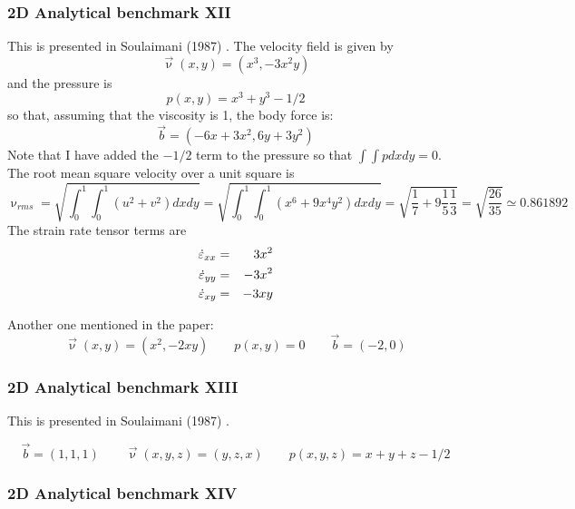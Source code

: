 \subsubsection{2D Analytical benchmark XII}\label{ss:sofo87_2D}

This is presented in Soulaimani \etal (1987) \cite{sofo87}. 
The velocity field is given by
\[
\vec\upnu(x,y) = (x^3,-3x^2y) 
\]
and the pressure is 
\[
p(x,y)=x^3+y^3-1/2
\]
so that, assuming that the viscosity is 1, the body force is:
\[
\vec{b} = (-6x+3x^2,6y+3y^2)
\] 
Note that I have added the $-1/2$ term to the pressure so that $\int\int p dxdy=0$.
The root mean square velocity over a unit square is 
\[
\upnu_{rms} 
= \sqrt{ \int_0^1\int_0^1 (u^2+v^2) dx dy }
= \sqrt{ \int_0^1\int_0^1 (x^6 + 9 x^4 y^2) dx dy }
= \sqrt{ \frac{1}{7} + 9 \frac{1}{5} \frac{1}{3}  } 
= \sqrt{ \frac{26}{35} }
\simeq 0.861892 
\]
The strain rate tensor terms are
\begin{eqnarray}
\dot{\varepsilon}_{xx} &=& 3x^2  \nonumber\\
\dot{\varepsilon}_{yy} &=& -3x^2 \nonumber\\ 
\dot{\varepsilon}_{xy} &=& -3xy  \nonumber
\end{eqnarray}

Another one mentioned in the paper:
\[
\vec\upnu(x,y) =(x^2,-2xy)
\qquad
p(x,y)=0
\qquad
\vec{b}=(-2,0) 
\]

\subsubsection{2D Analytical benchmark XIII}\label{ss:sofo87_3D}

This is presented in Soulaimani \etal (1987) \cite{sofo87}. 

\[
\vec{b} = (1,1,1)
\qquad
\vec{\upnu}(x,y,z)=(y,z,x)
\qquad
p(x,y,z)=x+y+z-1/2
\]

\subsubsection{2D Analytical benchmark XIV\label{ss:mmsjolm17}}

